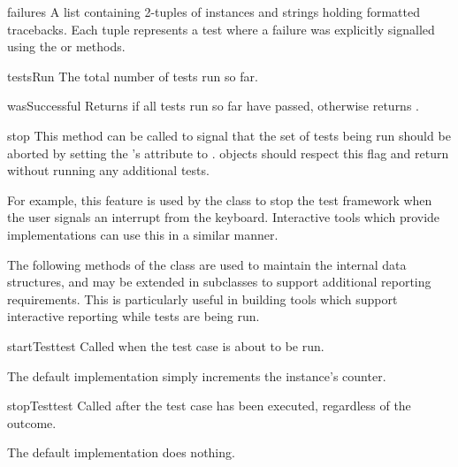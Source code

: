 \begin{memberdesc}[TestResult]{failures}
  A list containing 2-tuples of  instances and strings
  holding formatted tracebacks. Each tuple represents a test where a failure
  was explicitly signalled using the  or
   methods.
\end{memberdesc}

\begin{memberdesc}[TestResult]{testsRun}
  The total number of tests run so far.
\end{memberdesc}

\begin{methoddesc}[TestResult]{wasSuccessful}{}
  Returns  if all tests run so far have passed,
  otherwise returns .
\end{methoddesc}

\begin{methoddesc}[TestResult]{stop}{}
  This method can be called to signal that the set of tests being run
  should be aborted by setting the 's 
  attribute to .   objects should respect
  this flag and return without running any additional tests.
  
  For example, this feature is used by the  class
  to stop the test framework when the user signals an interrupt from
  the keyboard.  Interactive tools which provide 
  implementations can use this in a similar manner.
\end{methoddesc}


The following methods of the  class are used to
maintain the internal data structures, and may be extended in
subclasses to support additional reporting requirements.  This is
particularly useful in building tools which support interactive
reporting while tests are being run.

\begin{methoddesc}[TestResult]{startTest}{test}
  Called when the test case  is about to be run.
  
  The default implementation simply increments the instance's
   counter.
\end{methoddesc}

\begin{methoddesc}[TestResult]{stopTest}{test}
  Called after the test case  has been executed, regardless
  of the outcome.
  
  The default implementation does nothing.
\end{methoddesc}

